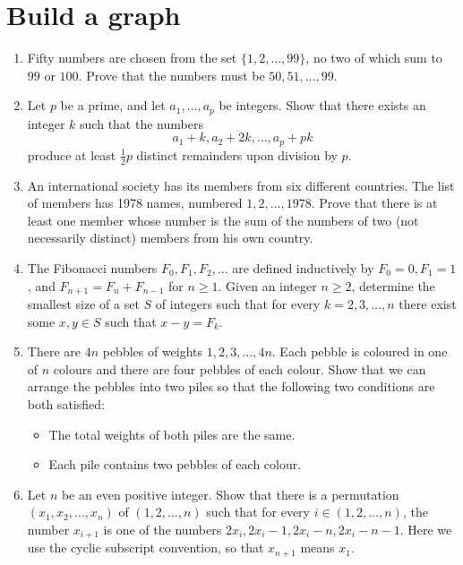 \documentclass{article}
\begin{document}
\section{Build a graph}
\begin{enumerate}
    \item Fifty numbers are chosen from the set $\{1,2,\ldots,99\}$, no two of
        which sum to $99$ or $100$. Prove that the numbers must be
        $50,51,\ldots,99$.
    \item Let $p$ be a prime, and let $a_1, \dots, a_p$ be integers. Show that
        there exists an integer $k$ such that the numbers
        \[a_1 + k, a_2 + 2k, \dots, a_p + pk\]produce at least $\tfrac{1}{2} p$
        distinct remainders upon division by $p$.
    \item An international society has its members from six different
        countries. The list of members has 1978 names, numbered $1, 2,
        \ldots, 1978$. Prove that there is at least one member whose
        number is the sum of the numbers of two (not necessarily
    distinct) members from his own country. 
    \item The Fibonacci numbers $F_0, F_1, F_2,\ldots$ are defined inductively
        by $F_0=0, F_1=1$, and $F_{n+1}=F_n+F_{n-1}$ for $n \ge 1$. Given an
        integer $n \ge 2$, determine the smallest size of a set $S$ of integers
        such that for every $k=2, 3, \ldots , n$ there exist some $x, y \in S$
        such that $x-y=F_k$.
    \item  There are $4n$ pebbles of weights $1, 2, 3, \dots, 4n$. Each pebble
        is coloured in one of $n$ colours and there are four pebbles of each
        colour. Show that we can arrange the pebbles into two piles so that the
        following two conditions are both satisfied:

        \begin{itemize}
            \item 
            The total weights of both piles are the same.
            \item
                Each pile contains two pebbles of each colour.
        \end{itemize}
    \item Let $n$ be an even positive integer. Show that there is a permutation 
        $(x_1, x_2, \ldots, x_n)$ of $(1, 2, \ldots, n)$ such that for every $i \in (1, 2, \ldots,
        n)$,
        the 
        number $x_{i+1}$ is one of the numbers $2x_i, 2x_i-1, 2x_i-n, 2x_i-n-1$. Here 
        we use the cyclic subscript convention, so that $x_{n+1}$ means $x_1$.  
\end{enumerate}
\end{document}
